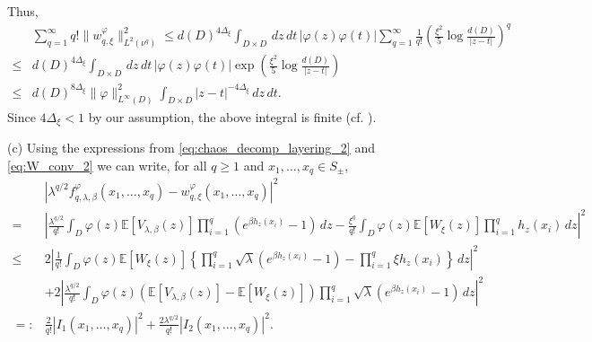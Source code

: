 \documentclass[a4paper, 11pt, reqno]{amsart}
\theoremstyle{definition} \newtheorem{defn}{Definition}[section]
\theoremstyle{remark} \newtheorem{rem}[defn]{Remark}
\theoremstyle{remark} \newtheorem*{rem*}{Remark}
\theoremstyle{plain} \newtheorem{thm}[defn]{Theorem}
\theoremstyle{plain} \newtheorem{lem}[defn]{Lemma}
\theoremstyle{plain} \newtheorem{prop}[defn]{Proposition}
\theoremstyle{plain} \newtheorem{cor}[defn]{Corollary}
\theoremstyle{remark} \newtheorem{exm}[defn]{\textbf{Example}}
\theoremstyle{remark} \newtheorem{exms}[defn]{\textbf{Examples}}
\theoremstyle{remark} \newtheorem*{bl}{}
\numberwithin{equation}{section} %
\newcommand{\x}{\times}
\newcommand{\E}{\mathbb{E}}
\begin{document}
		Thus,
		\begin{align}\label{eq:w_summable_4}
			& \sum_{q=1}^{\infty} q! \lVert w^{\varphi}_{q, \xi} \rVert_{L^2(\nu^q)}^2 \le  d(D)^{4\Delta_{\xi}} \int_{D\x D}   \, dz \, dt \, |\varphi(z) \varphi(t)|  \sum_{q=1}^{\infty}\frac{1}{q!}\left( \frac{\xi^2}{5}\log\frac{d(D)}{|z-t|}\right)^q 
			\nonumber \\
			\le & d(D)^{4\Delta_{\xi}} \int_{D\x D}   \, dz \, dt \, |\varphi(z) \varphi(t)|  \exp\left( \frac{\xi^2}{5}\log\frac{d(D)}{|z-t|} \right)
			\nonumber \\
			\le &  d(D)^{8\Delta_{\xi}} \lVert \varphi \rVert_{L^{\infty}(D)}^2 \int_{D\x D}  |z-t|^{-4\Delta_{\xi}} \, dz \, dt. 
		\end{align}
		Since $4\Delta_{\xi} < 1$ by our assumption, the above integral is finite (cf. \cite[Lemma A1]{cgpr21}).
		
		(c) Using the expressions from \eqref{eq:chaos_decomp_layering_2} and \eqref{eq:W_conv_2} we can write, for all $q \ge 1$ and $x_1, \ldots, x_q \in S_{\pm}$,
		\begin{align} \label{eq:f_w_conv_1}
			& \left| \lambda^{q/2} f^{\varphi}_{q, \lambda, \beta}(x_1, \ldots, x_q) - w^{\varphi}_{q, \xi}(x_1, \ldots, x_q)\right|^2
			\nonumber \\
			= & \left| \frac{\lambda^{q/2}}{q!} \int_D \varphi(z) \E[V_{\lambda, \beta}(z)] \prod_{i=1}^q (e^{\beta h_z(x_i) }-1) \, dz  - \frac{\xi^q}{q!} \int_D \varphi(z) \E[W_{\xi}(z)] \prod_{i=1}^q h_z(x_i) \, dz\right|^2
			\nonumber \\
			\le & 2 \left| \frac{1}{q!} \int_D  \varphi(z) \E[W_{\xi}(z)] \left\{ \prod_{i=1}^q \sqrt{\lambda} (e^{\beta h_z(x_i)}-1) - \prod_{i=1}^q \xi h_z(x_i)\right\} \, dz  \right|^2 
			\nonumber \\ 
			& + 2\left|  \frac{\lambda^{q/2}}{q!} \int_D  \varphi(z)( \E[V_{\lambda, \beta}(z)] - \E[W_{\xi}(z)])  \prod_{i=1}^q \sqrt{\lambda} (e^{\beta h_z(x_i)}-1)\, dz \right|^2
			\nonumber \\
			=: & \frac{2}{q!} |I_1(x_1, \ldots, x_q)|^2 + \frac{2 \lambda^{q/2}}{q!} |I_2(x_1, \ldots, x_q)|^2.
		\end{align}
		
\end{document}
